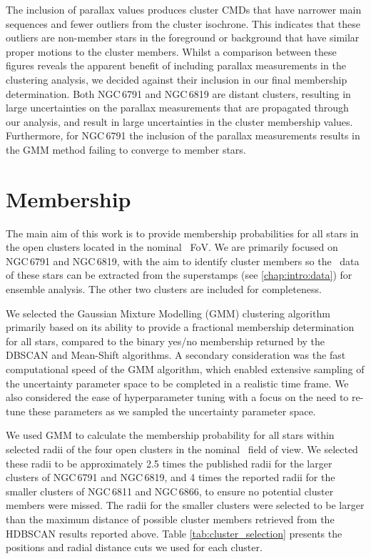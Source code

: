 The inclusion of parallax values produces cluster CMDs that have narrower main sequences and fewer outliers from the cluster isochrone. This indicates that these outliers are non-member stars in the foreground or background that have similar proper motions to the cluster members. Whilst a comparison between these figures reveals the apparent benefit of including parallax measurements in the clustering analysis, we decided against their inclusion in our final membership determination. Both NGC\,6791 and NGC\,6819 are distant clusters, resulting in large uncertainties on the parallax measurements that are propagated through our analysis, and result in large uncertainties in the cluster membership values. Furthermore, for NGC\,6791 the inclusion of the parallax measurements results in the GMM method failing to converge to member stars.


\section{Membership}

The main aim of this work is to provide membership probabilities for all stars in the open clusters located in the nominal \Kepler~FoV. We are primarily focused on NGC\,6791 and NGC\,6819, with the aim to identify cluster members so the \Kepler~data of these stars can be extracted from the superstamps (see \cref{chap:intro:data}) for ensemble analysis. The other two clusters are included for completeness.

We selected the Gaussian Mixture Modelling (GMM) clustering algorithm primarily based on its ability to provide a fractional membership determination for all stars, compared to the binary yes/no membership returned by the DBSCAN and Mean-Shift algorithms. A secondary consideration was the fast computational speed of the GMM algorithm, which enabled extensive sampling of the uncertainty parameter space to be completed in a realistic time frame. We also considered the ease of hyperparameter tuning with a focus on the need to re-tune these parameters as we sampled the uncertainty parameter space.

We used GMM to calculate the membership probability for all stars within selected radii of the four open clusters in the nominal \Kepler~field of view. We selected these radii to be approximately 2.5 times the published radii for the larger clusters of NGC\,6791 and NGC\,6819, and 4 times the reported radii for the smaller clusters of NGC\,6811 and NGC\,6866, to ensure no potential cluster members were missed. The radii for the smaller clusters were selected to be larger than the maximum distance of possible cluster members retrieved from the HDBSCAN results reported above. Table \ref{tab:cluster_selection} presents the positions and radial distance cuts we used for each cluster. 

